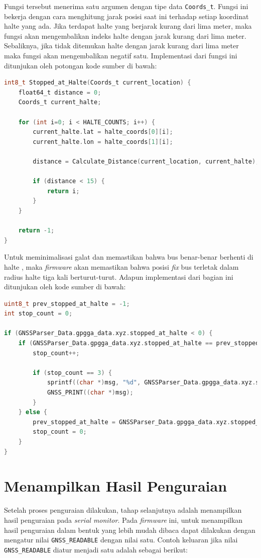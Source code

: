 Fungsi tersebut menerima satu argumen dengan tipe data \texttt{Coords\_t}. Fungsi ini bekerja dengan cara menghitung jarak posisi saat ini terhadap setiap koordinat halte yang ada. Jika terdapat halte yang berjarak kurang dari lima meter, maka fungsi akan mengembalikan indeks halte dengan jarak kurang dari lima meter. Sebaliknya, jika tidak ditemukan halte dengan jarak kurang dari lima meter maka fungsi akan mengembalikan negatif satu. Implementasi dari fungsi ini ditunjukan oleh potongan kode sumber di bawah:

\begin{lstlisting}[language=c]
int8_t Stopped_at_Halte(Coords_t current_location) {
	float64_t distance = 0;
	Coords_t current_halte;
	
	for (int i=0; i < HALTE_COUNTS; i++) {
		current_halte.lat = halte_coords[0][i];
		current_halte.lon = halte_coords[1][i];
		
		distance = Calculate_Distance(current_location, current_halte);
		
		if (distance < 15) {
			return i;
		}
	}
	
	return -1;
}
\end{lstlisting}

Untuk meminimalisasi galat dan memastikan bahwa bus benar-benar berhenti di halte , maka \textit{firmware} akan memastikan bahwa posisi \textit{fix} bus terletak dalam radius halte tiga kali berturut-turut. Adapun implementasi dari bagian ini ditunjukan oleh kode sumber di bawah:

\begin{lstlisting}[language=c]
uint8_t prev_stopped_at_halte = -1;
int stop_count = 0; 

if (GNSSParser_Data.gpgga_data.xyz.stopped_at_halte < 0) {
	if (GNSSParser_Data.gpgga_data.xyz.stopped_at_halte == prev_stopped_at_halte) {
		stop_count++; 
		
		if (stop_count == 3) { 
			sprintf((char *)msg, "%d", GNSSParser_Data.gpgga_data.xyz.stopped_at_halte);
			GNSS_PRINT((char *)msg);
		}
	} else {
		prev_stopped_at_halte = GNSSParser_Data.gpgga_data.xyz.stopped_at_halte;
		stop_count = 0; 
	}
}
\end{lstlisting}

\section{Menampilkan Hasil Penguraian}
Setelah proses penguraian dilakukan, tahap selanjutnya adalah menampilkan hasil penguraian pada \textit{serial monitor}. Pada \textit{firmware} ini, untuk menampilkan hasil penguraian dalam bentuk yang lebih mudah dibaca dapat dilakukan dengan mengatur nilai \texttt{GNSS\_READABLE} dengan nilai satu. Contoh keluaran jika nilai \texttt{GNSS\_READABLE} diatur menjadi satu adalah sebagai berikut:

